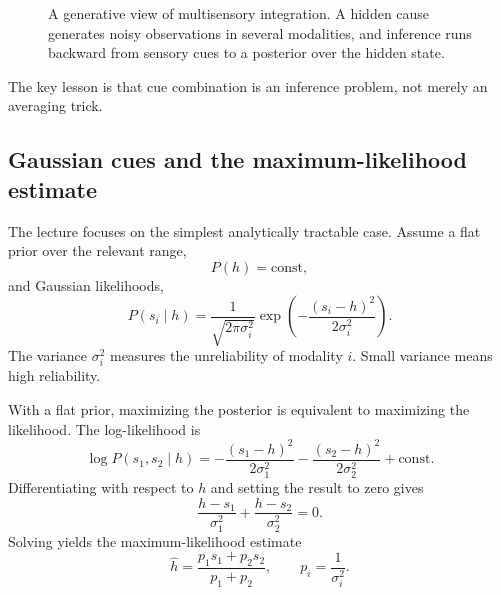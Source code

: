 \begin{figure}[!htbp]
\centering
{}
\caption{A generative view of multisensory integration. A hidden cause generates noisy observations in several modalities, and inference runs backward from sensory cues to a posterior over the hidden state.}
\end{figure}

The key lesson is that cue combination is an inference problem, not merely an averaging trick.

\subsection{Gaussian cues and the maximum-likelihood estimate}

The lecture focuses on the simplest analytically tractable case. Assume a flat prior over the relevant range,
\[
P(h)=\text{const},
\]
and Gaussian likelihoods,
\[
P(s_i\mid h)=\frac{1}{\sqrt{2\pi\sigma_i^2}}\exp\left(-\frac{(s_i-h)^2}{2\sigma_i^2}\right).
\]
The variance \(\sigma_i^2\) measures the unreliability of modality \(i\). Small variance means high reliability.

With a flat prior, maximizing the posterior is equivalent to maximizing the likelihood. The log-likelihood is
\[
\log P(s_1,s_2\mid h)
=
-\frac{(s_1-h)^2}{2\sigma_1^2}
-\frac{(s_2-h)^2}{2\sigma_2^2}
+\text{const}.
\]
Differentiating with respect to \(h\) and setting the result to zero gives
\[
\frac{h-s_1}{\sigma_1^2}+\frac{h-s_2}{\sigma_2^2}=0.
\]
Solving yields the maximum-likelihood estimate
\[
\hat h = \frac{p_1 s_1 + p_2 s_2}{p_1+p_2},
\qquad
p_i=\frac{1}{\sigma_i^2}.
\]

